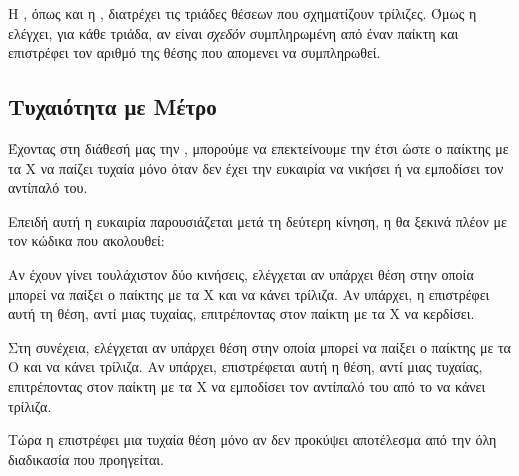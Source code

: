 \documentclass[a4paper,11pt,oneside]{book}
\begin{document}
Η , όπως και η , διατρέχει τις τριάδες θέσεων που σχηματίζουν τρίλιζες. Όμως η  ελέγχει, για κάθε τριάδα, αν είναι \emph{σχεδόν} συμπληρωμένη από έναν παίκτη και επιστρέφει τον αριθμό της θέσης που απομενει να συμπληρωθεί.

\subsection{Τυχαιότητα με Μέτρο}

Έχοντας στη διάθεσή μας την , μπορούμε να επεκτείνουμε την  έτσι ώστε ο παίκτης με τα Χ να παίζει τυχαία μόνο όταν δεν έχει την ευκαιρία να νικήσει ή να εμποδίσει τον αντίπαλό του.

Επειδή αυτή η ευκαιρία παρουσιάζεται μετά τη δεύτερη κίνηση, η  θα ξεκινά πλέον με τον κώδικα που ακολουθεί:



Αν έχουν γίνει τουλάχιστον δύο κινήσεις, ελέγχεται αν υπάρχει θέση στην οποία μπορεί να παίξει ο παίκτης με τα X και να κάνει τρίλιζα. Αν υπάρχει, η  επιστρέφει αυτή τη θέση, αντί μιας τυχαίας, επιτρέποντας στον παίκτη με τα Χ να κερδίσει.


Στη συνέχεια, ελέγχεται αν υπάρχει θέση στην οποία μπορεί να παίξει ο παίκτης με τα Ο και να κάνει τρίλιζα. Αν υπάρχει, επιστρέφεται αυτή η θέση, αντί μιας τυχαίας, επιτρέποντας στον παίκτη με τα Χ να εμποδίσει τον αντίπαλό του από το να κάνει τρίλιζα. 


Τώρα η  επιστρέφει μια τυχαία θέση μόνο αν δεν προκύψει αποτέλεσμα από την όλη διαδικασία που προηγείται.
\end{document}
